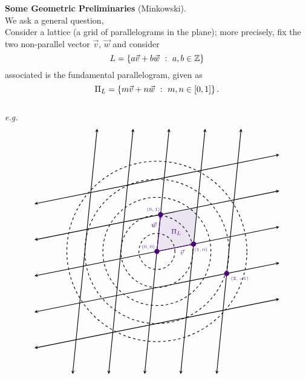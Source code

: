 {\bf Some Geometric Preliminaries} (Minkowski).\\[0.5em]
We ask a general question,\\[0.5em]
Consider a lattice (a grid of parallelograms in the plane); more precisely, fix the two non-parallel vector $\vec{v},\,\vec{w}$ and consider
\[L = \left\{a\vec{v}+b\vec{w}\ :\ a,b \in \mathbb Z\right\}\]
associated is the fundamental parallelogram, given as \[\Pi_L = \left\{m\vec{v}+n\vec{w}\ :\ m,n \in [0,1]\right\}.\]\\
\emph{e.g.}
\[\begin{tikzpicture}[scale=3]
    \draw[<->,thick,>=stealth] (0.83,-1.7)--(1.17,1.7);
    \draw[<->,thick,>=stealth] (0.33,-1.7)--(0.67,1.7);
    \draw[<->,thick,>=stealth] (-0.17,-1.7)--(0.17,1.7);
    \draw[<->,thick,>=stealth] (-0.67,-1.7)--(-0.33,1.7);
    \draw[<->,thick,>=stealth] (-1.17,-1.7)--(-0.83,1.7);
    \draw[<->,thick,>=stealth] (-1.7,0.66)--(1.7,1.34);
    \draw[<->,thick,>=stealth] (-1.7,0.16)--(1.7,0.84);
    \draw[<->,thick,>=stealth] (-1.7,-0.34)--(1.7,0.34);
    \draw[<->,thick,>=stealth] (-1.7,-0.84)--(1.7,-0.16);
    \draw[<->,thick,>=stealth] (-1.7,-1.34)--(1.7,-0.66);
    \coordinate (a) at (0,0);
    \coordinate (b) at (0.051,0.5102);
    \coordinate (c) at (0.5612,0.6122);
    \coordinate (d) at (0.5102,0.102);
    \fill [indigo, fill opacity=1/10] 
        (a) -- (b) -- (c) -- (d) -- cycle;
    \draw[thick,dashed](0,0) circle (0.25);
    \draw[thick,dashed](0,0) circle (0.5);
    \draw[thick,dashed](0,0) circle (0.75);
    \draw[thick,dashed](0,0) circle (1);
    \draw[thick,dashed](0,0) circle (1.25);
    \fill[color=indigo] (0,0) circle (1pt);
    \fill[color=indigo] (0.051,0.5102) circle (1pt);
    \fill[color=indigo] (0.5102,0.102) circle (1pt);
    \fill[color=indigo] (0.9694,-0.3061) circle (1pt);
    \draw[->,thick,>=stealth,color=indigo] (0,0)--(0.051,0.5102);
    \draw[->,thick,>=stealth,color=indigo] (0,0)--(0.5102,0.102);
	\node[color=indigo] at (0.35,-0.01) {\footnotesize$\vec{v}$};
    \node[color=indigo] at (-0.04,0.37) {\footnotesize $\vec{w}$};
    \node[color=indigo] at (1.15,-0.38) {\tiny $(2,-1)$};
    \node[color=indigo] at (-0.12,0.06) {\tiny $(0,0)$};
    \node[color=indigo] at (0.61,0.02) {\tiny $(1,0)$};
    \node[color=indigo] at (-0.05,0.58) {\tiny $(0,1)$};
    \node[color=indigo] at (0.27,0.27) {\footnotesize $\Pi_L$};
\end{tikzpicture}\]\\
